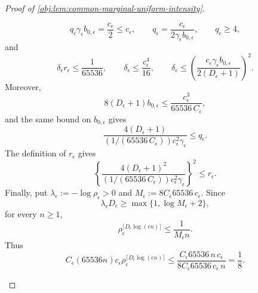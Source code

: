 \documentclass[11pt]{article}
\begin{document}
\begin{proof}[Proof of \cref{obj:lem:common-marginal-uniform-intensity}]
\begin{enumerate}
\[
q_\epsilon\gamma_\epsilon b_{0,\epsilon}
=\frac{c_\epsilon}{2}\le c_\epsilon,\qquad
q_\epsilon=\frac{c_\epsilon}{2\gamma_\epsilon b_{0,\epsilon}},\qquad
q_\epsilon\ge4,
\]
and
\[
\delta_\epsilon r_\epsilon\le\frac1{65536},\qquad
\delta_\epsilon\le\frac{c_\epsilon^4}{16},\qquad
\delta_\epsilon\le
\left(\frac{c_\epsilon\gamma_\epsilon b_{0,\epsilon}}
{2(D_\epsilon+1)}\right)^2 .
\]
Moreover,
\[
8(D_\epsilon+1)b_{0,\epsilon}
\le
\frac{c_\epsilon^3}{65536\,C_\epsilon},
\]
and the same bound on \(b_{0,\epsilon}\) gives
\[
\frac{4(D_\epsilon+1)}
{(1/(65536\,C_\epsilon))c_\epsilon^2\gamma_\epsilon}
\le q_\epsilon .
\]
The definition of \(r_\epsilon\) gives
\[
\left\{
\frac{4(D_\epsilon+1)^2}
{(1/(65536\,C_\epsilon))c_\epsilon^2\gamma_\epsilon}
\right\}^2
\le r_\epsilon .
\]
Finally, put \(\lambda_\epsilon:=-\log\rho_\epsilon>0\) and
\(M_\epsilon:=8C_\epsilon 65536\,c_\epsilon\). Since
\[
\lambda_\epsilon D_\epsilon
\ge \max\{1,\log M_\epsilon+2\},
\]
for every \(n\ge1\),
\[
\rho_\epsilon^{\lceil D_\epsilon\log(en)\rceil}
\le \frac1{M_\epsilon n}.
\]
Thus
\[
C_\epsilon(65536n)c_\epsilon
\rho_\epsilon^{\lceil D_\epsilon\log(en)\rceil}
\le
\frac{C_\epsilon 65536\,n\,c_\epsilon}{8C_\epsilon 65536\,c_\epsilon\,n}
=\frac18 .
\]


\end{enumerate}
\end{proof}
\end{document}
